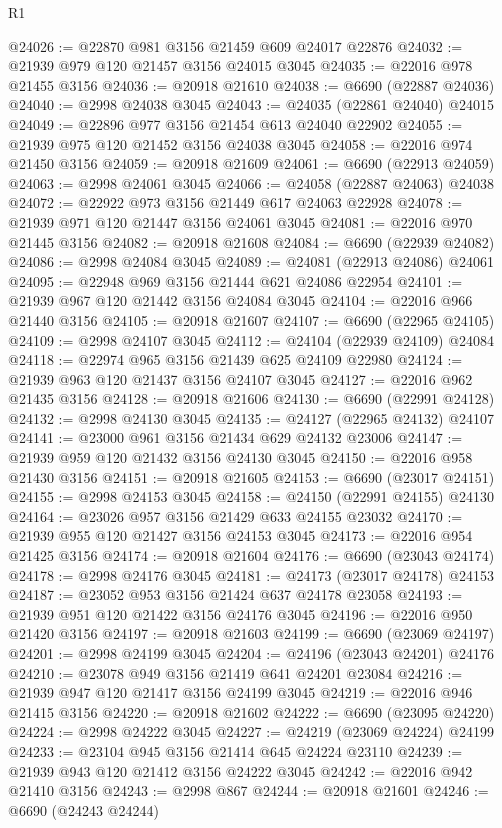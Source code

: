 \begin{lexlean}{R1}
\begin{coremodule}
@24026 := @22870 @981 @3156 @21459 @609 @24017 @22876
@24032 := @21939 @979 @120 @21457 @3156 @24015 @3045
@24035 := @22016 @978 @21455 @3156
@24036 := @20918 @21610
@24038 := @6690 (@22887 @24036)
@24040 := @2998 @24038 @3045
@24043 := @24035 (@22861 @24040) @24015
@24049 := @22896 @977 @3156 @21454 @613 @24040 @22902
@24055 := @21939 @975 @120 @21452 @3156 @24038 @3045
@24058 := @22016 @974 @21450 @3156
@24059 := @20918 @21609
@24061 := @6690 (@22913 @24059)
@24063 := @2998 @24061 @3045
@24066 := @24058 (@22887 @24063) @24038
@24072 := @22922 @973 @3156 @21449 @617 @24063 @22928
@24078 := @21939 @971 @120 @21447 @3156 @24061 @3045
@24081 := @22016 @970 @21445 @3156
@24082 := @20918 @21608
@24084 := @6690 (@22939 @24082)
@24086 := @2998 @24084 @3045
@24089 := @24081 (@22913 @24086) @24061
@24095 := @22948 @969 @3156 @21444 @621 @24086 @22954
@24101 := @21939 @967 @120 @21442 @3156 @24084 @3045
@24104 := @22016 @966 @21440 @3156
@24105 := @20918 @21607
@24107 := @6690 (@22965 @24105)
@24109 := @2998 @24107 @3045
@24112 := @24104 (@22939 @24109) @24084
@24118 := @22974 @965 @3156 @21439 @625 @24109 @22980
@24124 := @21939 @963 @120 @21437 @3156 @24107 @3045
@24127 := @22016 @962 @21435 @3156
@24128 := @20918 @21606
@24130 := @6690 (@22991 @24128)
@24132 := @2998 @24130 @3045
@24135 := @24127 (@22965 @24132) @24107
@24141 := @23000 @961 @3156 @21434 @629 @24132 @23006
@24147 := @21939 @959 @120 @21432 @3156 @24130 @3045
@24150 := @22016 @958 @21430 @3156
@24151 := @20918 @21605
@24153 := @6690 (@23017 @24151)
@24155 := @2998 @24153 @3045
@24158 := @24150 (@22991 @24155) @24130
@24164 := @23026 @957 @3156 @21429 @633 @24155 @23032
@24170 := @21939 @955 @120 @21427 @3156 @24153 @3045
@24173 := @22016 @954 @21425 @3156
@24174 := @20918 @21604
@24176 := @6690 (@23043 @24174)
@24178 := @2998 @24176 @3045
@24181 := @24173 (@23017 @24178) @24153
@24187 := @23052 @953 @3156 @21424 @637 @24178 @23058
@24193 := @21939 @951 @120 @21422 @3156 @24176 @3045
@24196 := @22016 @950 @21420 @3156
@24197 := @20918 @21603
@24199 := @6690 (@23069 @24197)
@24201 := @2998 @24199 @3045
@24204 := @24196 (@23043 @24201) @24176
@24210 := @23078 @949 @3156 @21419 @641 @24201 @23084
@24216 := @21939 @947 @120 @21417 @3156 @24199 @3045
@24219 := @22016 @946 @21415 @3156
@24220 := @20918 @21602
@24222 := @6690 (@23095 @24220)
@24224 := @2998 @24222 @3045
@24227 := @24219 (@23069 @24224) @24199
@24233 := @23104 @945 @3156 @21414 @645 @24224 @23110
@24239 := @21939 @943 @120 @21412 @3156 @24222 @3045
@24242 := @22016 @942 @21410 @3156
@24243 := @2998 @867
@24244 := @20918 @21601
@24246 := @6690 (@24243 @24244)

\end{coremodule}
\end{lexlean}
